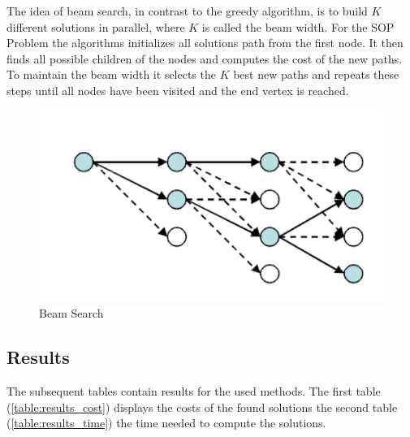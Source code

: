 \documentclass[]{article}
\begin{document}
    The idea of beam search, in contrast to the greedy algorithm, is to build $K$ different solutions in parallel, where $K$ is called the beam width. For the SOP Problem the algorithms initializes all solutions path from the first node. It then finds all possible children of the nodes and computes the cost of the new paths. To maintain the beam width it selects the $K$ best new paths and repeats these steps until all nodes have been visited and the end vertex is reached. \cite{Beam:1} \cite{Beam:2} 

    \begin{figure}[hbt]
    	\includegraphics[]{files/beam_search.png}
    	\centering
    	\caption{Beam Search}
    \end{figure}


    \subsection{Results}
    \label{results}

    The subsequent tables contain results for the used methods. The first table (\ref{table:results_cost}) displays the costs of the found solutions the second table (\ref{table:results_time}) the time needed to compute the solutions. 
\end{document}
